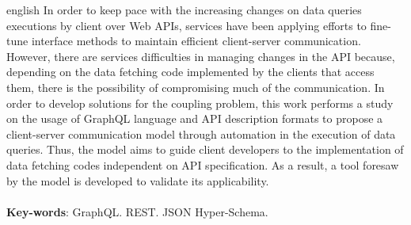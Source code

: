 \begin{resumo}[Abstract]
  \begin{otherlanguage*}{english}
    In order to keep pace with the increasing changes on data queries executions by client over Web APIs, services have been applying efforts to fine-tune interface methods to maintain efficient client-server communication. However, there are services difficulties in managing changes in the API because, depending on the data fetching code implemented by the clients that access them, there is the possibility of compromising much of the communication. In order to develop solutions for the coupling problem, this work performs a study on the usage of GraphQL language and API description formats to propose a client-server communication model through automation in the execution of data queries. Thus, the model aims to guide client developers to the implementation of data fetching codes independent on API specification. As a result, a tool foresaw by the model is developed to validate its applicability. \\ \\
    \textbf{Key-words}: GraphQL. REST. JSON Hyper-Schema.
  \end{otherlanguage*}
\end{resumo}
